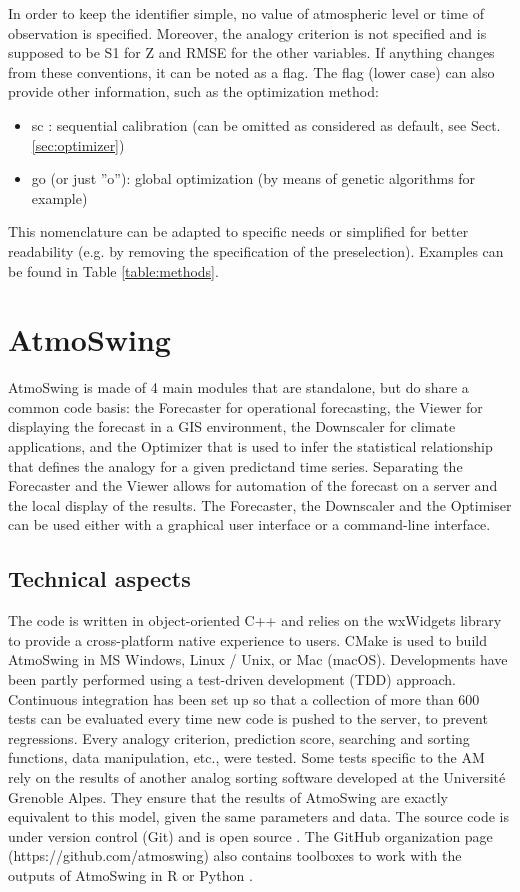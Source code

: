 \documentclass[gmd]{copernicus}
\begin{document}
In order to keep the identifier simple, no value of atmospheric level or time of observation is specified. Moreover, the analogy criterion is not specified and is supposed to be S1 for Z and RMSE for the other variables. If anything changes from these conventions, it can be noted as a flag. The flag (lower case) can also provide other information, such as the optimization method:
\begin{itemize}
	\item sc : sequential calibration (can be omitted as considered as default, see Sect. \ref{sec:optimizer})
	\item go (or just ''o''): global optimization (by means of genetic algorithms for example)
\end{itemize}

This nomenclature can be adapted to specific needs or simplified for better readability (e.g. by removing the specification of the preselection). Examples can be found in Table \ref{table:methods}.


\section{AtmoSwing}
\label{sec:atmoswing}

AtmoSwing is made of 4 main modules that are standalone, but do share a common code basis: the Forecaster for operational forecasting, the Viewer for displaying the forecast in a GIS environment, the Downscaler for climate applications, and the Optimizer that is used to infer the statistical relationship that defines the analogy for a given predictand time series. Separating the Forecaster and the Viewer allows for automation of the forecast on a server and the local display of the results. The Forecaster, the Downscaler and the Optimiser can be used either with a graphical user interface or a command-line interface.


\subsection{Technical aspects}

The code is written in object-oriented C++ and relies on the wxWidgets \citep{Smart2006} library to provide a cross-platform native experience to users. CMake is used to build AtmoSwing in MS Windows, Linux / Unix, or Mac (macOS). Developments have been partly performed using a test-driven development (TDD) approach. Continuous integration has been set up so that a collection of more than 600 tests can be evaluated every time new code is pushed to the server, to prevent regressions. Every analogy criterion, prediction score, searching and sorting functions, data manipulation, etc., were tested. Some tests specific to the AM rely on the results of another analog sorting software developed at the Universit\'{e} Grenoble Alpes. They ensure that the results of AtmoSwing are exactly equivalent to this model, given the same parameters and data. The source code is under version control (Git) and is open source \citep[on GitHub, www.atmoswing.org,][]{Horton2018c}. The GitHub organization page (https://github.com/atmoswing) also contains toolboxes to work with the outputs of AtmoSwing in R \citep{Horton2018d} or Python \citep{Horton2018e}.
\end{document}
